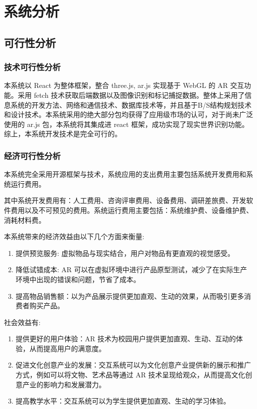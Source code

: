 \section{系统分析}
\subsection{可行性分析}
\subsubsection{技术可行性分析}

本系统以 React 为整体框架，整合 three.js, ar.js 实现基于 WebGL 的 AR 交互功能。采用 fetch 技术获取后端数据以及图像识别和标记捕捉数据。整体上采用了信息系统的开发方法、网络和通信技术、数据库技术等，并且基于B/S结构规划技术和设计技术。本系统采用的绝大部分包均获得了应用级市场的认可，对于尚未广泛使用的 ar.js 包，本系统将其集成进 react 框架，成功实现了现实世界识别功能。综上，本系统开发技术是完全可行的。

\subsubsection{经济可行性分析}

本系统完全采用开源框架与技术，系统应用的支出费用主要包括系统开发费用和系统运行费用。

其中系统开发费用有：人工费用、咨询评审费用、设备费用、调研差旅费、开发软件费用以及不可预见的费用。系统运行费用主要包括：系统维护费、设备维护费、消耗材料费。

本系统带来的经济效益由以下几个方面来衡量:
\begin{enumerate}
  \item 提供预览服务: 虚拟物品与现实结合，用户对物品有更直观的视觉感受。
  \item 降低试错成本: AR 可以在虚拟环境中进行产品原型测试，减少了在实际生产环境中出现的错误和问题，节省了成本。
  \item 提高物品销售额：以为产品展示提供更加直观、生动的效果，从而吸引更多消费者购买产品。
\end{enumerate}

社会效益有:
\begin{enumerate}
  \item 提供更好的用户体验：AR 技术为校园用户提供更加直观、生动、互动的体验，从而提高用户的满意度。
  \item 促进文化创意产业的发展：交互系统可以为文化创意产业提供新的展示和推广方式，例如可以将文物、艺术品等通过 AR 技术呈现给观众，从而提高文化创意产业的影响力和发展潜力。
  \item 提高教学水平：交互系统可以为学生提供更加直观、生动的学习体验。
\end{enumerate}

